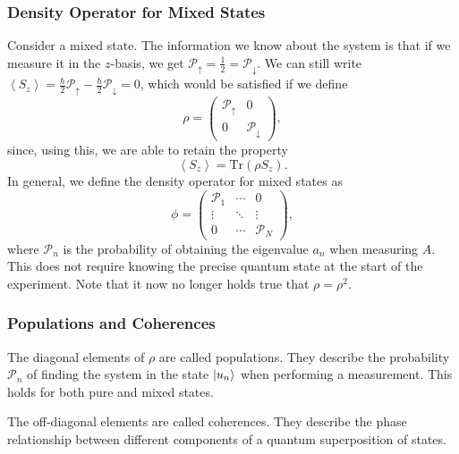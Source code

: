 \documentclass{article}
\begin{document}
\subsubsection{Density Operator for Mixed States}
Consider a mixed state. The information we know about the system is that if we measure it in the $z$-basis, we get $\mathcal{P}_{\uparrow}=\frac{1}{2}=\mathcal{P}_{\downarrow}$. We can still write $\left\langle S_z \right\rangle =\frac{\hbar}{2}\mathcal{P}_{\uparrow}-\frac{\hbar}{2}\mathcal{P}_{\downarrow}=0$, which would be satisfied if we define
\[
    \rho =\begin{pmatrix}
        \mathcal{P}_{\uparrow} & 0 \\
        0 & \mathcal{P}_{\downarrow}
    \end{pmatrix},
\]
since, using this, we are able to retain the property
\[
    \left\langle S_z \right\rangle =\text{Tr}(\rho S_z).
\]
In general, we define the density operator for mixed states as
\[
    \phi =\begin{pmatrix}
        \mathcal{P}_1 & \cdots & 0 \\
        \vdots & \ddots & \vdots \\
        0 & \cdots & \mathcal{P}_{N}
    \end{pmatrix},
\]
where $\mathcal{P}_n$ is the probability of obtaining the eigenvalue $a_n$ when measuring $A$. This does not require knowing the precise quantum state at the start of the experiment. Note that it now no longer holds true that $\rho =\rho^2$.

\subsubsection{Populations and Coherences}
The diagonal elements of $\rho $ are called populations. They describe the probability $\mathcal{P}_n$ of finding the system in the state $\ket{u_n}$ when performing a measurement. This holds for both pure and mixed states.

The off-diagonal elements are called coherences. They describe the phase relationship between different components of a quantum superposition of states.
\end{document}

